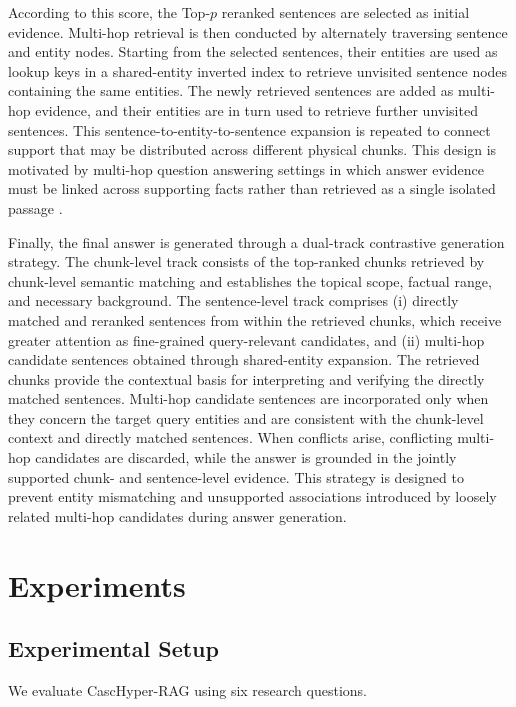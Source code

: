 \documentclass[a4paper,fleqn]{cas-dc}
\begin{document}
According to this score, the Top-$p$ reranked sentences are selected as initial evidence. Multi-hop retrieval is then conducted by alternately traversing sentence and entity nodes. Starting from the selected sentences, their entities are used as lookup keys in a shared-entity inverted index to retrieve unvisited sentence nodes containing the same entities. The newly retrieved sentences are added as multi-hop evidence, and their entities are in turn used to retrieve further unvisited sentences. This sentence-to-entity-to-sentence expansion is repeated to connect support that may be distributed across different physical chunks. This design is motivated by multi-hop question answering settings in which answer evidence must be linked across supporting facts rather than retrieved as a single isolated passage \citep{Yang2018HotpotQA}.

Finally, the final answer is generated through a dual-track contrastive generation strategy. The chunk-level track consists of the top-ranked chunks retrieved by chunk-level semantic matching and establishes the topical scope, factual range, and necessary background. The sentence-level track comprises (i) directly matched and reranked sentences from within the retrieved chunks, which receive greater attention as fine-grained query-relevant candidates, and (ii) multi-hop candidate sentences obtained through shared-entity expansion. The retrieved chunks provide the contextual basis for interpreting and verifying the directly matched sentences. Multi-hop candidate sentences are incorporated only when they concern the target query entities and are consistent with the chunk-level context and directly matched sentences. When conflicts arise, conflicting multi-hop candidates are discarded, while the answer is grounded in the jointly supported chunk- and sentence-level evidence. This strategy is designed to prevent entity mismatching and unsupported associations introduced by loosely related multi-hop candidates during answer generation.

\section{Experiments}\label{sec:experiments}
\subsection{Experimental Setup}

We evaluate CascHyper-RAG using six research questions.
\end{document}
